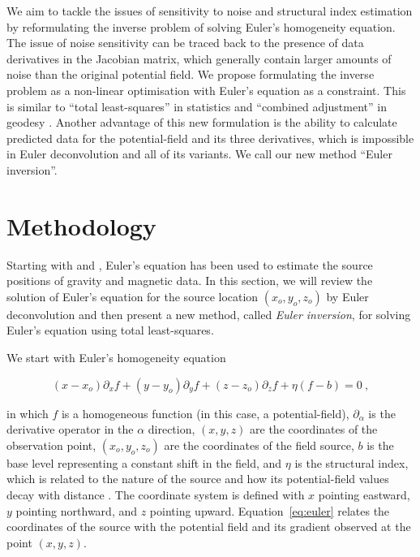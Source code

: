 We aim to tackle the issues of sensitivity to noise and structural index estimation by reformulating the inverse problem of solving Euler's homogeneity equation.
The issue of noise sensitivity can be traced back to the presence of data derivatives in the Jacobian matrix, which generally contain larger amounts of noise than the original potential field.
We propose formulating the inverse problem as a non-linear optimisation with Euler's equation as a constraint.
This is similar to ``total least-squares'' in statistics \citep{VanHuffel1991} and ``combined adjustment'' in geodesy \citep{Vanicek1986}.
Another advantage of this new formulation is the ability to calculate predicted data for the potential-field and its three derivatives, which is impossible in Euler deconvolution and all of its variants.
We call our new method ``Euler inversion''.

\section{Methodology}

Starting with \citet{Thompson1982} and \citet{Reid1990}, Euler's equation has
been used to estimate the source positions of gravity and magnetic data.
In this section, we will review the solution of Euler's equation for
the source location $(x_o, y_o, z_o)$ by Euler deconvolution \citep{Reid1990} and then present a
new method, called \textit{Euler inversion}, for solving Euler's equation using
total least-squares.

We start with Euler's homogeneity equation

\begin{equation}
  (x - x_o)\partial_x f + (y - y_o)\partial_y f + (z - z_o)\partial_z f
  + \eta(f - b) = 0
  \ ,
  \label{eq:euler}
\end{equation}

\noindent
in which $f$ is a homogeneous function (in this case, a potential-field),
$\partial_\alpha$ is the derivative operator in the $\alpha$ direction,
$(x, y, z)$ are the coordinates of the observation point,
$(x_o, y_o, z_o)$ are the coordinates of the field source,
$b$ is the base level representing a constant shift in the field,
and $\eta$ is the structural index, which is related to the nature of the
source and how its potential-field values decay with distance
\citep{Ruddock1966,Reid2014}.
The coordinate system is defined with $x$ pointing eastward, $y$ pointing northward, and $z$ pointing upward.
Equation~\ref{eq:euler} relates the coordinates of the source with the
potential field and its gradient observed at the point $(x, y, z)$.

